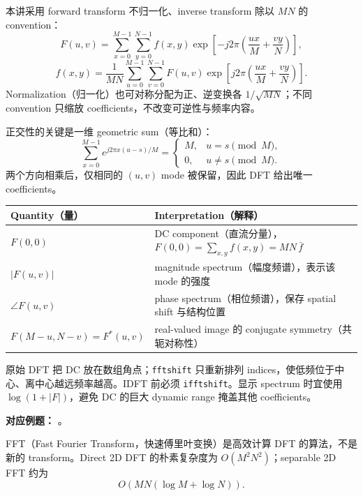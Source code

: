 
本讲采用 forward transform 不归一化、inverse transform 除以 $MN$ 的 convention：
\[
  \boxed{F(u,v)=\sum_{x=0}^{M-1}\sum_{y=0}^{N-1}
  f(x,y)\exp\!\left[-j2\pi\left(\frac{ux}{M}+\frac{vy}{N}\right)\right]},
\]
\[
  \boxed{f(x,y)=\frac1{MN}\sum_{u=0}^{M-1}\sum_{v=0}^{N-1}
  F(u,v)\exp\!\left[j2\pi\left(\frac{ux}{M}+\frac{vy}{N}\right)\right]}.
\]
Normalization（归一化）也可对称分配为正、逆变换各 $1/\sqrt{MN}$；不同 convention 只缩放 coefficients，不改变可逆性与频率内容。

正交性的关键是一维 geometric sum（等比和）：
\[
  \sum_{x=0}^{M-1}e^{j2\pi x(u-s)/M}
  =\begin{cases}M,&u=s\pmod M,\\0,&u\ne s\pmod M.\end{cases}
\]
两个方向相乘后，仅相同的 $(u,v)$ mode 被保留，因此 DFT 给出唯一 coefficients。

\begin{center}
\small
\begin{tabularx}{\textwidth}{@{}>{\raggedright\arraybackslash}p{3.2cm}X@{}}
  \toprule
  Quantity（量） & Interpretation（解释） \\
  \midrule
  $F(0,0)$ & DC component（直流分量），$F(0,0)=\sum_{x,y}f(x,y)=MN\,\bar f$ \\
  $|F(u,v)|$ & magnitude spectrum（幅度频谱），表示该 mode 的强度 \\
  $\angle F(u,v)$ & phase spectrum（相位频谱），保存 spatial shift 与结构位置 \\
  $F(M-u,N-v)=F^*(u,v)$ & real-valued image 的 conjugate symmetry（共轭对称性） \\
  \bottomrule
\end{tabularx}
\end{center}

原始 DFT 把 DC 放在数组角点；\texttt{fftshift} 只重新排列 indices，使低频位于中心、离中心越远频率越高。IDFT 前必须 \texttt{ifftshift}。显示 spectrum 时宜使用 $\log(1+|F|)$，避免 DC 的巨大 dynamic range 掩盖其他 coefficients。

\textbf{对应例题：}
。


FFT（Fast Fourier Transform，快速傅里叶变换）是高效计算 DFT 的算法，不是新的 transform。Direct 2D DFT 的朴素复杂度为 $O(M^2N^2)$；separable 2D FFT 约为
\[
  O\!\left(MN(\log M+\log N)\right).
\]

